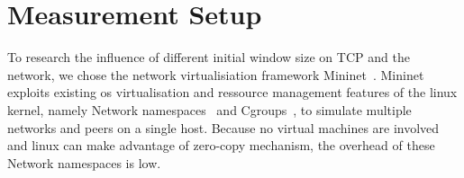 \section{Measurement Setup}
\label{sec:measurement_setup}

To research the influence of different initial window size on TCP and the
network, we chose the network virtualisiation framework Mininet~\cite{mininet}.
Mininet exploits existing os virtualisation and ressource management features of
the linux kernel, namely Network namespaces~\cite{network_namespaces} and
Cgroups~\cite{cgroups}, to simulate multiple networks and peers on a single
host. Because no virtual machines are involved and linux can make advantage of
zero-copy mechanism, the overhead of these Network namespaces is low.
